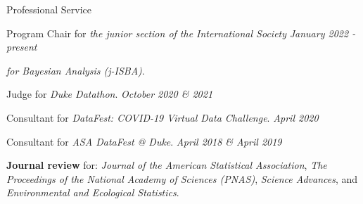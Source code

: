 \documentclass{resume} %
\begin{document}
\begin{rSection}{Professional Service}


Program Chair for \emph{the junior section of the International Society} \hfill {\em January 2022 - present}

\vspace{-0.1in}
\emph{for Bayesian Analysis (j-ISBA)}.

\smallskip



Judge for \emph{Duke Datathon}.  \hfill {\em October 2020 \& 2021}







\smallskip

Consultant for \emph{DataFest: COVID-19 Virtual Data Challenge}.  \hfill {\em April 2020}



\smallskip

Consultant for \emph{ASA DataFest @ Duke}. \hfill {\em April 2018 \& April 2019}

\smallskip

\textbf{Journal review} for: \emph{Journal of the American Statistical Association}, \emph{The Proceedings of the National Academy of Sciences (PNAS)}, \emph{Science Advances}, and \emph{Environmental and Ecological Statistics}. 

\end{rSection}


\end{document}
